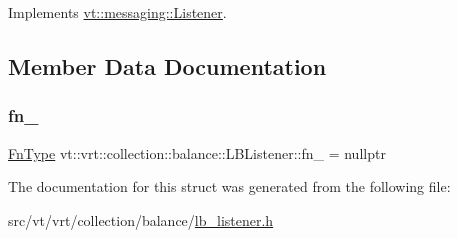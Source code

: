 Implements \hyperlink{structvt_1_1messaging_1_1_listener_ab2b334277feecb181a28f613c68bfc53}{vt\+::messaging\+::\+Listener}.



\subsection{Member Data Documentation}
\mbox{\label{structvt_1_1vrt_1_1collection_1_1balance_1_1_l_b_listener_a71e01f997215a3b8c5eb659a1921b6f7}} 
\subsubsection{\texorpdfstring{fn\+\_\+}{fn\_}}
{\footnotesize\ttfamily \hyperlink{structvt_1_1vrt_1_1collection_1_1balance_1_1_l_b_listener_af3b881f723f2d7850f6941261449e4d9}{Fn\+Type} vt\+::vrt\+::collection\+::balance\+::\+L\+B\+Listener\+::fn\+\_\+ = nullptr\hspace{0.3cm}{\ttfamily [private]}}



The documentation for this struct was generated from the following file\+:\begin{DoxyCompactItemize}
\item 
src/vt/vrt/collection/balance/\hyperlink{lb__listener_8h}{lb\+\_\+listener.\+h}\end{DoxyCompactItemize}
